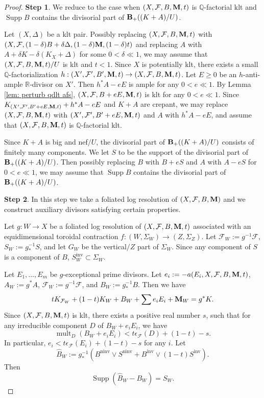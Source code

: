 \documentclass[12pt]{amsart}
\newcommand{\liu}[1]{{\textcolor{magenta}{[Liu: #1]}}}
\newcommand{\calum}[1]{{\textcolor{blue}{[Calum: #1]}}}
\numberwithin{equation}{section}
\newcommand{\Mm}{{\bf{M}}}
\newcommand{\Qq}{\mathbb{Q}}
\newcommand{\Rr}{\mathbb{R}}
\newcommand{\ninv}{\operatorname{ninv}}
\newcommand{\inv}{\operatorname{inv}}
\newcommand{\Supp}{\operatorname{Supp}}
\newcommand{\mult}{\operatorname{mult}}
\newcommand{\Bb}{{\bf{B}}}
\newcommand{\Ff}{\mathcal{F}}
\theoremstyle{definition}
\theoremstyle{definition}
\theoremstyle{definition}
\begin{document}
\begin{proof}

\noindent\textbf{Step 1}. We reduce to the case when $(X,\Ff,B,\Mm,t)$ is $\Qq$-factorial klt and $\Supp B$ contains the divisorial part of $\Bb_+((K+A)/U)$.

Let $(X,\Delta)$ be a klt pair. Possibly replacing $(X,\Ff,B,\Mm,t)$ with $(X,\Ff,(1-\delta)B+\delta\Delta,(1-\delta)\Mm,(1-\delta)t)$ and replacing $A$ with $A+\delta K-\delta(K_X+\Delta)$ for some $0<\delta\ll 1$, we may assume that $(X,\Ff,B,\Mm,t)/U$ is klt and $t<1$. Since $X$ is potentially klt, there exists a small $\Qq$-factorialization $h: (X',\Ff',B',\Mm,t)\rightarrow (X,\Ff,B,\Mm,t)$. 
Let $E\geq 0$ be an $h$-anti-ample $\Rr$-divisor on $X'$. Then $h^\ast A-eE$ is ample for any $0<e\ll 1$. By Lemma \ref{lem: perturb qdlt afs}, $(X,\Ff,B+eE,\Mm,t)$ is klt for any $0<e\ll 1$. Since $K_{(X',\Ff',B'+eE,\Mm,t)}+h^\ast A-eE$ and $K+A$ are crepant, we may replace $(X,\Ff,B,\Mm,t)$ with $(X',\Ff',B'+eE,\Mm,t)$ and $A$ with $h^\ast A-eE$, and assume that $(X,\Ff,B,\Mm,t)$ is $\Qq$-factorial klt.

Since $K+A$ is big and nef$/U$, the divisorial part of $\Bb_+((K+A)/U)$ consists of finitely many components. We let $S$ to be the support of the divisorial part of  $\Bb_+((K+A)/U)$. Then possibly replacing $B$ with $B+eS$ and $A$ with $A-eS$ for $0<e\ll 1$, we may assume that $\Supp B$ contains the divisorial part of $\Bb_+((K+A)/U)$.

\medskip

\noindent\textbf{Step 2}. In this step we take a foliated log resolution of $(X,\Ff,B,\Mm)$ and we construct auxiliary divisors satisfying certain properties.

Let $g: W\rightarrow X$ be a foliated log resolution of $(X,\Ff,B,\Mm,t)$ associated with an equidimensional toroidal contraction $f: (W,\Sigma_W)\rightarrow (Z,\Sigma_Z)$. 
Let $\Ff_W:=g^{-1}\Ff$, $S_W:=g^{-1}_\ast S$, and let $G_W$ be the vertical$/Z$ part of $\Sigma_W$.
Since any component of $S$ is a component of $B$, $S_W^{\inv}\subset\Sigma_W$.

Let $E_{1},\dots,E_{m}$ be $g$-exceptional prime divisors. Let $e_i:=-a(E_i,X,\Ff,B,\Mm,t)$, $A_W:=g^\ast A$, $\Ff_W:=g^{-1}\Ff$, and $B_W:=g^{-1}_\ast B$. 
Then we have
$$tK_{\Ff_W}+(1-t)K_W+B_W+\sum e_iE_i+\Mm_W=g^\ast K.$$
Since $(X,\Ff,B,\Mm,t)$ is klt, there exists a positive real number $s$, such that for any irreducible component $D$ of $B_W+e_iE_i$, we have
$$\mult_D(B_W+e_iE_i)<t\epsilon_{\Ff}(D)+(1-t)-s.$$
In particular, $e_i<t\epsilon_{\Ff}(E_i)+(1-t)-s$ for any $i$. Let
$$\widehat B_W:=g^{-1}_\ast (B^{\ninv}\vee S^{\ninv}+B^{\inv}\vee (1-t)S^{\inv}).$$
Then
$$\Supp(\widehat B_W-B_W)=S_W.$$


\end{proof}
\end{document}
